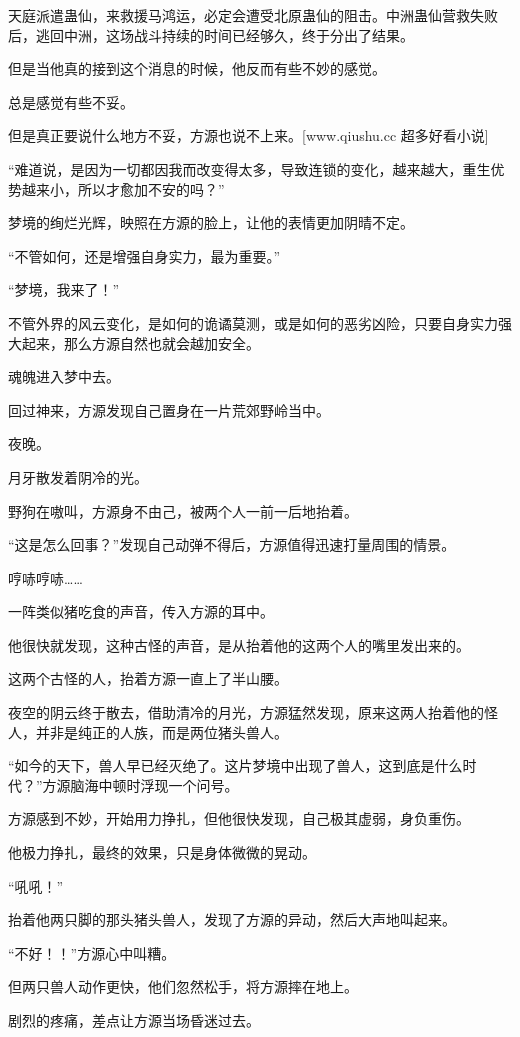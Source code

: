 \begin{this_body}
天庭派遣蛊仙，来救援马鸿运，必定会遭受北原蛊仙的阻击。中洲蛊仙营救失败后，逃回中洲，这场战斗持续的时间已经够久，终于分出了结果。

但是当他真的接到这个消息的时候，他反而有些不妙的感觉。

总是感觉有些不妥。

但是真正要说什么地方不妥，方源也说不上来。[www.qiushu.cc 超多好看小说]

“难道说，是因为一切都因我而改变得太多，导致连锁的变化，越来越大，重生优势越来小，所以才愈加不安的吗？”

梦境的绚烂光辉，映照在方源的脸上，让他的表情更加阴晴不定。

“不管如何，还是增强自身实力，最为重要。”

“梦境，我来了！”

不管外界的风云变化，是如何的诡谲莫测，或是如何的恶劣凶险，只要自身实力强大起来，那么方源自然也就会越加安全。

魂魄进入梦中去。

回过神来，方源发现自己置身在一片荒郊野岭当中。

夜晚。

月牙散发着阴冷的光。

野狗在嗷叫，方源身不由己，被两个人一前一后地抬着。

“这是怎么回事？”发现自己动弹不得后，方源值得迅速打量周围的情景。

哼哧哼哧……

一阵类似猪吃食的声音，传入方源的耳中。

他很快就发现，这种古怪的声音，是从抬着他的这两个人的嘴里发出来的。

这两个古怪的人，抬着方源一直上了半山腰。

夜空的阴云终于散去，借助清冷的月光，方源猛然发现，原来这两人抬着他的怪人，并非是纯正的人族，而是两位猪头兽人。

“如今的天下，兽人早已经灭绝了。这片梦境中出现了兽人，这到底是什么时代？”方源脑海中顿时浮现一个问号。

方源感到不妙，开始用力挣扎，但他很快发现，自己极其虚弱，身负重伤。

他极力挣扎，最终的效果，只是身体微微的晃动。

“吼吼！”

抬着他两只脚的那头猪头兽人，发现了方源的异动，然后大声地叫起来。

“不好！！”方源心中叫糟。

但两只兽人动作更快，他们忽然松手，将方源摔在地上。

剧烈的疼痛，差点让方源当场昏迷过去。


\end{this_body}
